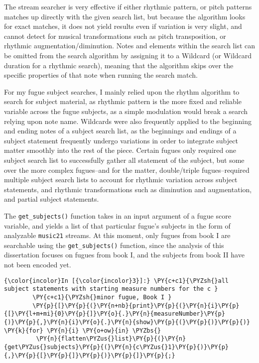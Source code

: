 The stream searcher is very effective if either rhythmic pattern, or
pitch patterns matches up directly with the given search list, but
because the algorithm looks for exact matches, it does not yield results
even if variation is very slight, and cannot detect for musical
transformations such as pitch transposition, or rhythmic
augmentation/diminution. Notes and elements within the search list can
be omitted from the search algorithm by assigning it to a Wildcard (or
Wildcard duration for a rhythmic search), meaning that the algorithm
skips over the specific properties of that note when running the search
match.

For my fugue subject searches, I mainly relied upon the rhythm algorithm
to search for subject material, as rhythmic pattern is the more fixed
and reliable variable across the fugue subjects, as a simple modulation
would break a search relying upon note name. Wildcards were also
frequently applied to the beginning and ending notes of a subject search
list, as the beginnings and endings of a subject statement frequently
undergo variations in order to integrate subject matter smoothly into
the rest of the piece. Certain fugues only required one subject search
list to successfully gather all statement of the subject, but some over
the more complex fugues--and for the matter, double/triple
fugues--required multiple subject search lists to account for rhythmic
variation across subject statements, and rhythmic transformations such
as diminution and augmentation, and partial subject statements.

The \texttt{get\_subjects()} function takes in an input argument of a
fugue score variable, and yields a list of that particular fugue's
subjects in the form of analyzable \texttt{music21} streams. At this
moment, only fugues from book I are searchable using the
\texttt{get\_subjects()} function, since the analysis of this
dissertation focuses on fugues from book I, and the subjects from book
II have not been encoded yet.

    \begin{Verbatim}[commandchars=\\\{\}]
{\color{incolor}In [{\color{incolor}3}]:} \PY{c+c1}{\PYZsh{}all subject statements with starting measure numbers for the c }
        \PY{c+c1}{\PYZsh{}minor fugue, Book I }
        \PY{p}{[}\PY{p}{(}\PY{n+nb}{print}\PY{p}{(}\PY{n}{i}\PY{p}{[}\PY{l+m+mi}{0}\PY{p}{]}\PY{o}{.}\PY{n}{measureNumber}\PY{p}{)}\PY{p}{,}\PY{n}{i}\PY{o}{.}\PY{n}{show}\PY{p}{(}\PY{p}{)}\PY{p}{)} \PY{k}{for} \PY{n}{i} \PY{o+ow}{in} \PYZbs{}
         \PY{n}{flatten\PYZus{}list}\PY{p}{(}\PY{n}{get\PYZus{}subjects}\PY{p}{(}\PY{n}{c\PYZus{}1}\PY{p}{)}\PY{p}{,}\PY{p}{[}\PY{p}{]}\PY{p}{)}\PY{p}{]}\PY{p}{;}
\end{Verbatim}

